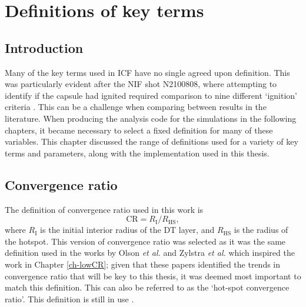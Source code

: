 

\chapter{Definitions of key terms} \label{ch:definitions}

\minitoc

\section{Introduction}

Many of the key terms used in ICF have no single agreed upon definition. This was particularly evident after the NIF shot N2100808, where attempting to identify if the capsule had ignited required comparison to nine different `ignition' criteria \cite{Abu-Shawareb2022}. This can be a challenge when comparing between results in the literature. When producing the analysis code for the simulations in the following chapters, it became necessary to select a fixed definition for many of these variables. This chapter discussed the range of definitions used for a variety of key terms and parameters, along with the implementation used in this thesis.


\section{Convergence ratio}
The definition of convergence ratio used in this work is 
\begin{equation} \mathrm{CR} =  R_\mathrm{I}/R_\mathrm{HS}, \label{CR} \end{equation} 
where $R_\mathrm{I}$ is the initial interior radius of the DT layer, and $R_\mathrm{HS}$ is the radius of the hotspot. This version of convergence ratio was selected as it was the same definition used in the works by Olson \textit{et al.} \cite{Olson2016} and Zylstra \textit{et al.} \cite{Zylstra2018} which inspired the work in Chapter \ref{ch-lowCR}; given that these papers identified the trends in convergence ratio that will be key to this thesis, it was deemed most important to match this definition. This can also be referred to as the `hot-spot convergence ratio'. This definition is still in use \cite{Olson2021}.

